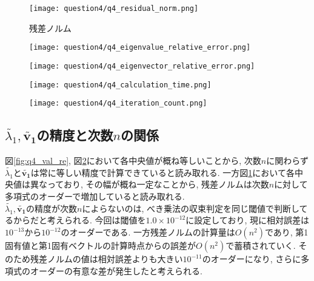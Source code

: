 \documentclass[uplatex,a4j]{jsarticle}
\begin{document}
\begin{figure}[ht]
  \centering
  \texttt{[image: question4/q4\_residual\_norm.png]}
  \caption{残差ノルム}
  \label{fig:q4_rn}
\end{figure}

\begin{figure}[htbp]
  \centering

  \begin{minipage}[t]{0.48\textwidth}
    \centering
    \texttt{[image: question4/q4\_eigenvalue\_relative\_error.png]}
    \label{fig:q4_val_re}
  \end{minipage}
  \hfill
  \begin{minipage}[t]{0.48\textwidth}
    \centering
    \texttt{[image: question4/q4\_eigenvector\_relative\_error.png]}
    \label{fig:q4_vec_re}
  \end{minipage}
  
\end{figure}

\begin{figure}[htbp]
  \centering

  \begin{minipage}[t]{0.48\textwidth}
    \centering
    \texttt{[image: question4/q4\_calculation\_time.png]}
    \label{fig:q4_ct}
  \end{minipage}
  \hfill
  \begin{minipage}[t]{0.48\textwidth}
    \centering
    \texttt{[image: question4/q4\_iteration\_count.png]}
    \label{fig:q4_ic}
  \end{minipage}
  
\end{figure}

\newpage
\subsection{$\tilde{\lambda_1}, \bm{\tilde{v_1}}$の精度と次数$n$の関係}
\label{sec:q4_2}
図\ref{fig:q4_val_re}, 図\ref{fig:q4_vec_re}において各中央値が概ね等しいことから, 
次数$n$に関わらず$\tilde{\lambda_1}$と$\bm{\tilde{v_1}}$は常に等しい精度で計算できていると読み取れる. 
一方図\ref{fig:q4_rn}において各中央値は異なっており, その幅が概ね一定なことから, 
残差ノルムは次数$n$に対して多項式のオーダーで増加していると読み取れる. \\
$\tilde{\lambda_1}, \bm{\tilde{v_1}}$の精度が次数$n$によらないのは, 
べき乗法の収束判定を同じ閾値で判断してるからだと考えられる. 
今回は閾値を$1.0 \times 10^{-12}$に設定しており, 現に相対誤差は$10^{-13}$から$10^{-12}$のオーダーである. 
一方残差ノルムの計算量は$O(n^2)$であり, 第1固有値と第1固有ベクトルの計算時点からの誤差が$O(n^2)$で蓄積されていく. 
そのため残差ノルムの値は相対誤差よりも大きい$10^{-11}$のオーダーになり, 
さらに多項式のオーダーの有意な差が発生したと考えられる.
\end{document}

